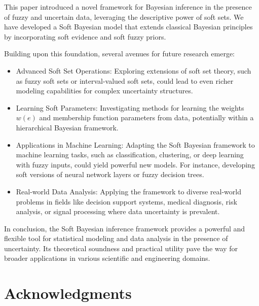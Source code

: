 \documentclass[twoside]{article}
\begin{document}
This paper introduced a novel framework for Bayesian inference in the presence of fuzzy and uncertain data, leveraging the descriptive power of soft sets. We have developed a Soft Bayesian model that extends classical Bayesian principles by incorporating soft evidence and soft fuzzy priors.

Building upon this foundation, several avenues for future research emerge:
\begin{itemize}
    \item Advanced Soft Set Operations: Exploring extensions of soft set theory, such as fuzzy soft sets or interval-valued soft sets, could lead to even richer modeling capabilities for complex uncertainty structures.
    \item Learning Soft Parameters: Investigating methods for learning the weights $w(e)$ and membership function parameters from data, potentially within a hierarchical Bayesian framework.
    \item Applications in Machine Learning: Adapting the Soft Bayesian framework to machine learning tasks, such as classification, clustering, or deep learning with fuzzy inputs, could yield powerful new models. For instance, developing soft versions of neural network layers or fuzzy decision trees.
    \item Real-world Data Analysis: Applying the framework to diverse real-world problems in fields like decision support systems, medical diagnosis, risk analysis, or signal processing where data uncertainty is prevalent.
\end{itemize}
In conclusion, the Soft Bayesian inference framework provides a powerful and flexible tool for statistical modeling and data analysis in the presence of uncertainty. Its theoretical soundness and practical utility pave the way for broader applications in various scientific and engineering domains.


\section*{Acknowledgments} 
\end{document}
